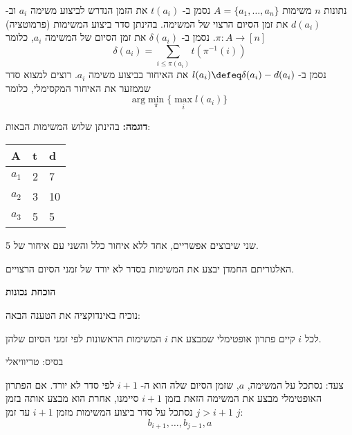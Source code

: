 נתונות $n$ משימות 
$A = \{a_1, \ldots, a_n\}$
נסמן ב-%
$t(a_i)$
את הזמן הנדרש לביצוע משימה 
$a_i$
וב-%
$d(a_i)$
את זמן הסיום הרצוי של המשימה.
בהינתן סדר ביצוע המשימות (פרמוטציה)
$\pi:A \to [n]$.
נסמן ב-%
$\delta(a_i)$
את זמן הסיום של המשימה 
$a_i$,
כלומר
$$\delta(a_i) = \sum_{i \leq \pi(a_i)} t(\pi^{-1}(i))$$
נסמן ב-%
$l(a_i) \defeq \delta(a_i) - d(a_i)$
את האיחור בביצוע משימה 
$a_i$.
רוצים למצוא סדר שממזער את האיחור המקסימלי, כלומר
$$
\text{arg}\min_\pi \{\max_i l(a_i)\}
$$

\textbf{דוגמה:}
בהינתן שלוש המשימות הבאות:
\begin{english}
\begin{center}
\begin{tabular}{|l|l|l|}
\hline
A & t & d
\\
\hline
$a_1$ & 2 & 7
\\ \hline
$a_2$ & 3 & 10
\\ \hline
$a_3$ & 5 & 5
\\ \hline
\end{tabular}
\end{center}
\end{english}

שני שיבוצים אפשריים, אחד ללא איחור כלל והשני עם איחור של 5.

\begin{center}
\end{center}


האלגוריתם החמדן יבצע את המשימות בסדר לא יורד של זמני הסיום הרצויים.

\textbf{הוכחת נכונות}

נוכיח באינדוקציה את הטענה הבאה:

לכל $i$ קיים פתרון אופטימלי שמבצע את $i$ המשימות הראשונות לפי זמני הסיום שלהן.

בסיס: טריוויאלי

צעד: נסתכל על המשימה, $a$, שזמן הסיום שלה הוא ה-%
$i+1$
לפי סדר לא יורד. 
אם הפתרון האופטימלי מבצע את המשימה הזאת בזמן 
$i + 1$
סיימנו, אחרת הוא מבצע אותה בזמן 
$j > i + 1$
נסתכל על סדר ביצוע המשימות מזמן 
$i + 1$
עד זמן 
$j$:
$$
b_{i + 1}, \ldots, b_{j - 1}, a
$$

